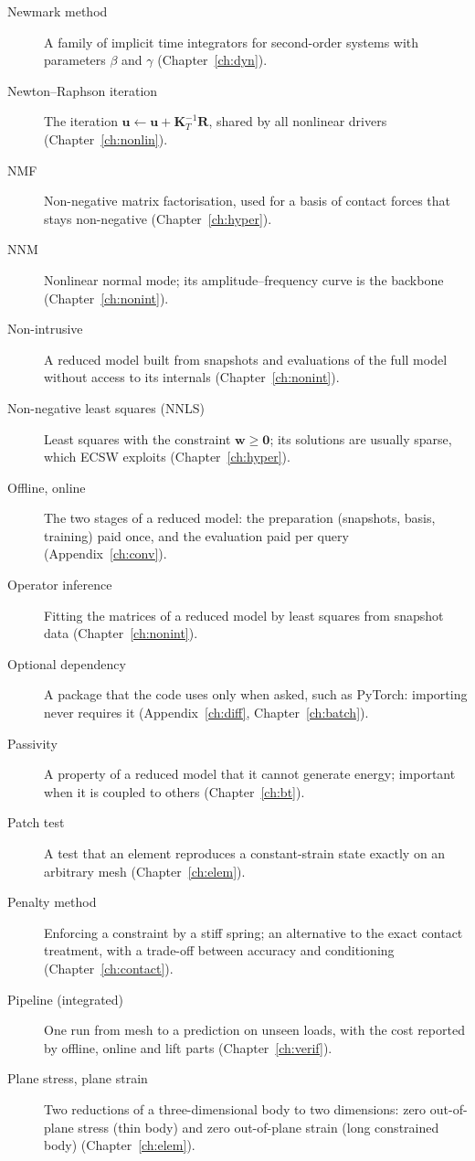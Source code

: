 \begin{description}
\item[Newmark method] A family of implicit time integrators for second-order systems with parameters $\beta$ and $\gamma$ (Chapter~\ref{ch:dyn}).
\item[Newton--Raphson iteration] The iteration $\bm u\leftarrow\bm u+\bm K_T^{-1}\bm R$, shared by all nonlinear drivers (Chapter~\ref{ch:nonlin}).
\item[NMF] Non-negative matrix factorisation, used for a basis of contact forces that stays non-negative (Chapter~\ref{ch:hyper}).
\item[NNM] Nonlinear normal mode; its amplitude--frequency curve is the backbone (Chapter~\ref{ch:nonint}).
\item[Non-intrusive] A reduced model built from snapshots and evaluations of the full model without access to its internals (Chapter~\ref{ch:nonint}).
\item[Non-negative least squares (NNLS)] Least squares with the constraint $\bm w\ge\bm0$; its solutions are usually sparse, which ECSW exploits (Chapter~\ref{ch:hyper}).
\item[Offline, online] The two stages of a reduced model: the preparation (snapshots, basis, training) paid once, and the evaluation paid per query (Appendix~\ref{ch:conv}).
\item[Operator inference] Fitting the matrices of a reduced model by least squares from snapshot data (Chapter~\ref{ch:nonint}).
\item[Optional dependency] A package that the code uses only when asked, such as PyTorch: importing never requires it (Appendix~\ref{ch:diff}, Chapter~\ref{ch:batch}).
\item[Passivity] A property of a reduced model that it cannot generate energy; important when it is coupled to others (Chapter~\ref{ch:bt}).
\item[Patch test] A test that an element reproduces a constant-strain state exactly on an arbitrary mesh (Chapter~\ref{ch:elem}).
\item[Penalty method] Enforcing a constraint by a stiff spring; an alternative to the exact contact treatment, with a trade-off between accuracy and conditioning (Chapter~\ref{ch:contact}).
\item[Pipeline (integrated)] One run from mesh to a prediction on unseen loads, with the cost reported by offline, online and lift parts (Chapter~\ref{ch:verif}).
\item[Plane stress, plane strain] Two reductions of a three-dimensional body to two dimensions: zero out-of-plane stress (thin body) and zero out-of-plane strain (long constrained body) (Chapter~\ref{ch:elem}).

\end{description}
